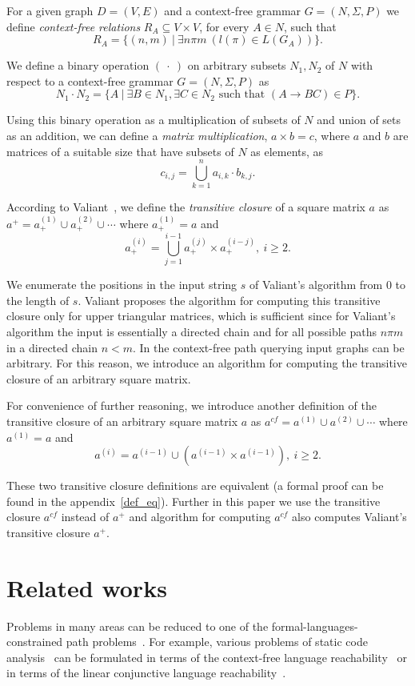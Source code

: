 \documentclass[runningheads,a4paper]{llncs}
\begin{document}
For a given graph $D = (V, E)$ and a context-free grammar $G = (N, \Sigma, P)$ we define \textit{context-free relations} $R_A \subseteq V \times V$, for every $A \in N$, such that $$R_A = \{(n,m)~|~\exists n \pi m~(l(\pi) \in L(G_A))\}.$$

We define a binary operation $(~\cdot~)$ on arbitrary subsets $N_1 , N_2$ of $N$ with respect to a context-free grammar $G = (N, \Sigma, P)$ as $$N_1 \cdot N_2 = \{A~|~\exists B \in N_1, \exists C \in N_2 \text{ such that }(A \rightarrow B C) \in P\}.$$

Using this binary operation as a multiplication of subsets of $N$ and union of sets as an addition, we can define a \textit{matrix multiplication}, $a \times b = c$, where $a$ and $b$ are matrices of a suitable size that have subsets of $N$ as elements, as $$c_{i,j} = \bigcup^{n}_{k=1}{a_{i,k} \cdot b_{k,j}}.$$

According to Valiant~\cite{valiant}, we define the \textit{transitive closure} of a square matrix $a$ as $a^+ = a^{(1)}_+ \cup a^{(2)}_+ \cup \cdots$ where $a^{(1)}_+ = a$ and $$a^{(i)}_+ = \bigcup^{i-1}_{j=1}{a^{(j)}_+ \times a^{(i-j)}_+}, ~i \ge 2.$$

We enumerate the positions in the input string $s$ of Valiant's algorithm from 0 to the length of $s$. Valiant proposes the algorithm for computing this transitive closure only for upper triangular matrices, which is sufficient since for Valiant's algorithm the input is essentially a directed chain and for all possible paths $n \pi m$ in a directed chain $n < m$. In the context-free path querying input graphs can be arbitrary. For this reason, we introduce an algorithm for computing the transitive closure of an arbitrary square matrix.

For convenience of further reasoning, we introduce another definition of the transitive closure of an arbitrary square matrix $a$ as $a^{cf} = a^{(1)} \cup a^{(2)} \cup \cdots$ where $a^{(1)} = a$ and $$a^{(i)} = a^{(i-1)} \cup (a^{(i-1)} \times a^{(i-1)}), ~i \ge 2.$$

These two transitive closure definitions are equivalent (a formal proof can be found in the appendix~\ref{def_eq}). Further in this paper we use the transitive closure $a^{cf}$ instead of $a^+$ and algorithm for computing $a^{cf}$ also computes Valiant's transitive closure $a^+$.

\section{Related works} \label{section_related}%
Problems in many areas can be reduced to one of the formal-languages-constrained path problems~\cite{barrett2000formal}. For example, various problems of static code analysis~\cite{bastani2015specification,xu2009scaling} can be formulated in terms of the context-free language reachability~\cite{reps1998program} or in terms of the linear conjunctive language reachability~\cite{zhang2017context}. 
\end{document}
